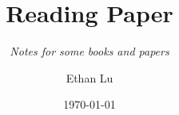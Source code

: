\documentclass[lang=en,12pt,twoside]{textbook}
\begin{document}
\title{Reading Paper}
\subtitle{\textit{Notes for some books and papers}}
\author{Ethan Lu}
\date{\today}
\publishers{Textbook}

\begin{titlepage} %
\end{titlepage}
\end{document}
